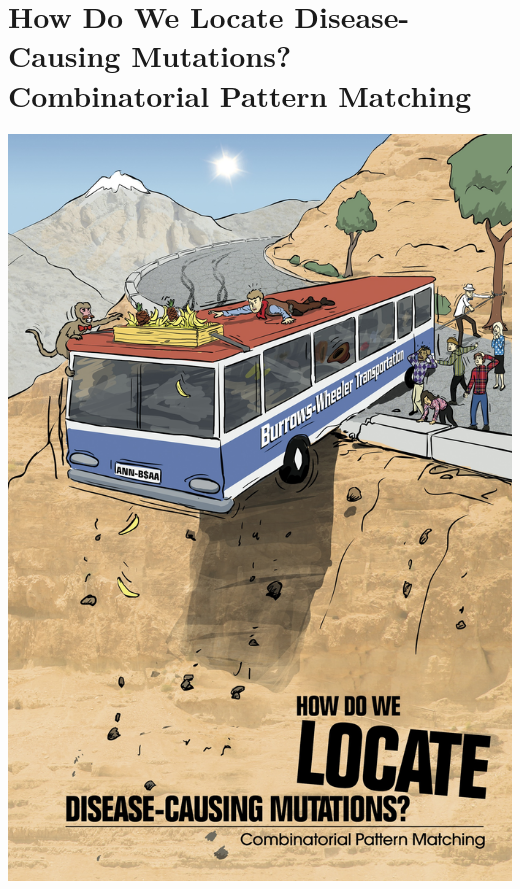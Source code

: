 \documentclass{article}
\begin{document}
\section{How Do We Locate Disease-Causing Mutations?\\ Combinatorial Pattern Matching}
\begin{center}
    \includegraphics[scale=0.72]{c9.jpg}
\end{center}
\pagebreak
\end{document}

